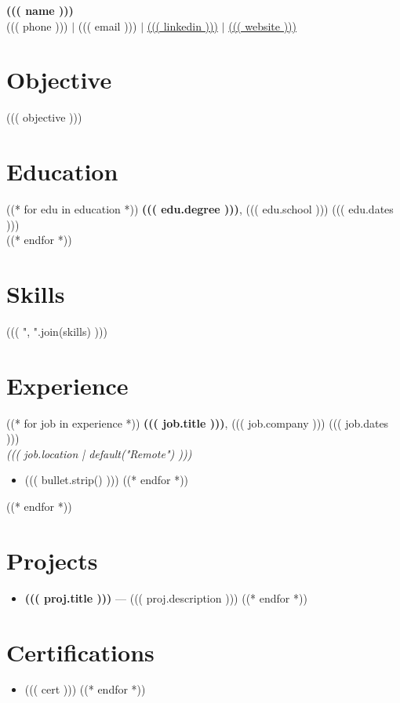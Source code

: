 \documentclass[11pt]{article}
\begin{document}
\begin{center}
    {\LARGE \textbf{((( name )))}}\\
    ((( phone ))) \quad $|$ \quad ((( email ))) \quad $|$ \quad \href{https://((( linkedin )))}{((( linkedin )))} \quad $|$ \quad \href{https://((( website )))}{((( website )))}
\end{center}

\vspace{0.5em}

\section*{Objective}
((( objective )))

\section*{Education}
((* for edu in education *))
\textbf{((( edu.degree )))}, ((( edu.school ))) \hfill ((( edu.dates )))\\
((* endfor *))

\section*{Skills}
((( ", ".join(skills) )))

\section*{Experience}
((* for job in experience *))
\textbf{((( job.title )))}, ((( job.company ))) \hfill ((( job.dates )))\\
\textit{((( job.location | default("Remote") )))}
\begin{itemize}[leftmargin=*]
((* for bullet in job.description.splitlines() *))
    \item ((( bullet.strip() )))
((* endfor *))
\end{itemize}
((* endfor *))

\section*{Projects}
\begin{itemize}[leftmargin=*]
((* for proj in projects *))
    \item \textbf{((( proj.title )))} — ((( proj.description )))
((* endfor *))
\end{itemize}

\section*{Certifications}
\begin{itemize}[leftmargin=*]
((* for cert in certifications *))
    \item ((( cert )))
((* endfor *))
\end{itemize}
\end{document}
